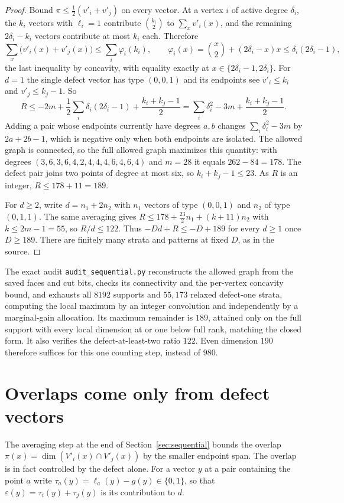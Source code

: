 \documentclass[11pt]{article}
\begin{document}
\begin{proof}
Bound $\pi\le\tfrac12(v'_i+v'_j)$ on every vector. At a vertex $i$ of
active degree $\delta_i$, the $k_i$ vectors with $\ell_i=1$ contribute
$\binom{k_i}{2}$ to $\sum_xv'_i(x)$, and the remaining $2\delta_i-k_i$
vectors contribute at most $k_i$ each. Therefore
\[
 \sum_x\bigl(v'_i(x)+v'_j(x)\bigr)
 \le\sum_i\varphi_i(k_i),\qquad
 \varphi_i(x)=\binom{x}{2}+(2\delta_i-x)x
 \le\delta_i(2\delta_i-1),
\]
the last inequality by concavity, with equality exactly at
$x\in\{2\delta_i-1,2\delta_i\}$. For $d=1$ the single defect vector has
type $(0,0,1)$ and its endpoints see $v'_i\le k_i$ and $v'_j\le k_j-1$. So
\[
 R\le-2m+\frac12\sum_i\delta_i(2\delta_i-1)+\frac{k_i+k_j-1}{2}
 =\sum_i\delta_i^2-3m+\frac{k_i+k_j-1}{2}.
\]
Adding a pair whose endpoints currently have degrees $a,b$ changes
$\sum_i\delta_i^2-3m$ by $2a+2b-1$, which is negative only when both
endpoints are isolated. The allowed graph is connected, so the full
allowed graph maximizes this quantity: with degrees
$(3,6,3,6,4,2,4,4,4,6,4,6,4)$ and $m=28$ it equals $262-84=178$. The
defect pair joins two points of degree at most six, so
$k_i+k_j-1\le23$. As $R$ is an integer, $R\le178+11=189$.

For $d\ge2$, write $d=n_1+2n_2$ with $n_1$ vectors of type $(0,0,1)$ and
$n_2$ of type $(0,1,1)$. The same averaging gives
$R\le178+\tfrac{23}{2}n_1+(k+11)n_2$ with $k\le2m-1=55$, so $R/d\le122$.
Thus $-Dd+R\le-D+189$ for every $d\ge1$ once $D\ge189$. There are finitely
many strata and patterns at fixed $D$, as in the source.
\end{proof}

The exact audit \texttt{audit\_sequential.py} reconstructs the allowed
graph from the saved faces and cut bits, checks its connectivity and the
per-vertex concavity bound, and exhausts all $8192$ supports and
$55{,}173$ relaxed defect-one strata, computing the local maximum by an
integer convolution and independently by a marginal-gain allocation. Its
maximum remainder is $189$, attained only on the full support with every
local dimension at or one below full rank, matching the closed form. It
also verifies the defect-at-least-two ratio $122$. Even dimension $190$
therefore suffices for this one counting step, instead of $980$.

\section{Overlaps come only from defect vectors}
\label{sec:overlap}
The averaging step at the end of Section~\ref{sec:sequential} bounds the
overlap $\pi(x)=\dim(V'_i(x)\cap V'_j(x))$ by the smaller endpoint span.
The overlap is in fact controlled by the defect alone. For a vector $y$ at a
pair containing the point $a$ write $\tau_a(y)=\ell_a(y)-g(y)\in\{0,1\}$,
so that $\varepsilon(y)=\tau_i(y)+\tau_j(y)$ is its contribution to $d$.
\end{document}
